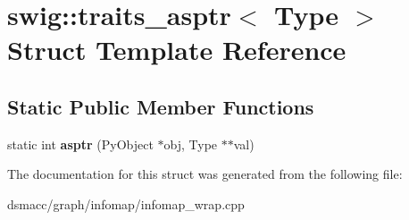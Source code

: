 \hypertarget{structswig_1_1traits__asptr}{}\section{swig\+:\+:traits\+\_\+asptr$<$ Type $>$ Struct Template Reference}
\label{structswig_1_1traits__asptr}
\subsection*{Static Public Member Functions}
\begin{DoxyCompactItemize}
\item 
\mbox{\label{structswig_1_1traits__asptr_aa24007f1d4126e9a4162bce7bf231931}} 
static int {\bfseries asptr} (Py\+Object $\ast$obj, Type $\ast$$\ast$val)
\end{DoxyCompactItemize}


The documentation for this struct was generated from the following file\+:\begin{DoxyCompactItemize}
\item 
dsmacc/graph/infomap/infomap\+\_\+wrap.\+cpp\end{DoxyCompactItemize}
